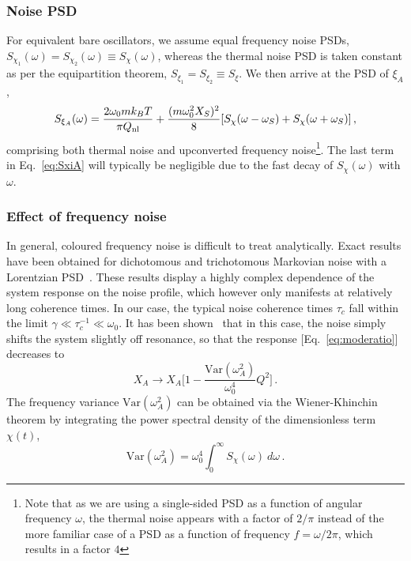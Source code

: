 \subsubsection{Noise PSD} For equivalent bare oscillators, we assume equal frequency noise PSDs, $S_{\chi_1}(\omega) = S_{\chi_2}(\omega) \equiv S_\chi(\omega)$, whereas the thermal noise PSD is taken constant as per the equipartition theorem, $S_{\xi_1} = S_{\xi_2} \equiv S_\xi$. We then arrive at the PSD of $\xi_A$,
\begin{equation} \label{eq:SxiA}
S_{\xi_A}(\omega) = \frac{2\omega_0 m k_B T}{\pi Q_{\rm nl}} + \frac{(m \omega_0^2 X_S)^2}{8} [S_{\chi}(\omega - \omega_S) + S_\chi(\omega + \omega_S)] \,,
\end{equation}
comprising both thermal noise and upconverted frequency noise\footnote{Note that as we are using a single-sided PSD as a function of angular frequency $\omega$, the thermal noise appears with a factor of $2/\pi$ instead of the more familiar case of a PSD as a function of frequency $f = \omega/2\pi$, which results in a factor $4$}. The last term in Eq.~\eqref{eq:SxiA} will typically be negligible due to the fast decay of $S_\chi(\omega)$ with $\omega$.

\subsubsection{Effect of frequency noise} In general, coloured frequency noise is difficult to treat analytically. Exact results have been obtained for dichotomous and trichotomous Markovian noise with a Lorentzian PSD~\cite{Bourret_1973, Gitterman_2003, Mankin_2008}. These results display a highly complex dependence of the system response on the noise profile, which however only manifests at relatively long coherence times. In our case, the typical noise coherence times $\tau_c$ fall within the limit $\gamma \ll \tau_c^{-1} \ll \omega_0$. It has been shown~\cite{Gitterman_2003} that in this case, the noise simply shifts the system slightly off resonance, so that the response [Eq.~\eqref{eq:moderatio}] decreases to
\begin{equation} \label{eq:varomega}
X_A \rightarrow X_A \bigg[1 - \frac{\text{Var}(\omega_A^2)}{\omega_0^4}Q^2\bigg] \,.
\end{equation}
The frequency variance $\text{Var}(\omega_A^2)$ can be obtained via the Wiener-Khinchin theorem by integrating the power spectral density of the dimensionless term $\chi(t)$,
\begin{equation} 
\text{Var}(\omega_A^2) = \omega_0^4 \int_0^\infty S_\chi(\omega) \:d\omega \,.
\end{equation}

